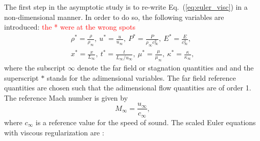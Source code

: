 \documentclass[preprint,10pt]{elsarticle}
\newcommand{\eqt}[1]{Eq.~(\ref{#1})}                     %
\newcommand{\tcr}[1]{\textcolor{red}{#1}}
\begin{document}
The first step in the asymptotic study is to re-write \eqt{eq:euler_visc} in a non-dimensional manner. 
In order to do so, the following variables are introduced:
%
\tcr{the * were at the wrong spots}
\begin{multline}
\label{eq:norm_param}
\rho^*   = \frac{\rho}{\rho_\infty}           ,\
u^*      = \frac{u}{u_\infty}                 ,\
P^*      = \frac{P}{\rho_\infty c^2_\infty}    ,\
E^*      = \frac{E}{c^2_\infty }              ,\\
x^* = \frac{x}{L_\infty}                      ,\
t^* = \frac{t}{L_\infty / u_\infty}           ,\ 
\mu^*    = \frac{\mu}{\mu_\infty}             ,\
\kappa^* = \frac{\kappa}{\kappa_\infty}       ,
\end{multline}
%
where  the subscript $\infty$ denote the far field or stagnation quantities and and the superscript $*$ stands for the adimensional variables. The far field reference quantities are chosen such that the adimensional flow quantities are of order 1. The reference Mach number is given by
%
\begin{equation}
M_\infty = \frac{u_\infty}{c_\infty} ,
\end{equation}
%
where $c_\infty$ is a reference value for the speed of sound.
The scaled Euler equations with viscous regularization are :
%
\end{document}

